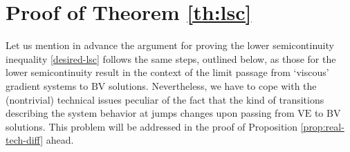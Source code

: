 \documentclass[a4paper,10pt,reqno]{amsart} %
\numberwithin{equation}{section}
\newcommand{\BV}{\mathrm{BV}}
\newcommand{\VE}{\mathrm{VE}}
\begin{document}
\section{Proof of Theorem \ref{th:lsc}}
\label{s:4}
Let us mention in advance the argument for proving the lower semicontinuity inequality \eqref{desired-lsc} follows the same steps, outlined below,  as those for the lower semicontinuity result \cite[Prop.\ 7.3]{MRS13}
in the context of the limit passage from `viscous' gradient systems to $\BV$ solutions. 
Nevertheless, we have to cope with  the (nontrivial)  technical issues peculiar of the fact that the kind of transitions describing the system behavior at jumps changes upon passing from $\VE$ to $\BV$ solutions. This problem will be addressed in the proof of Proposition  \ref{prop:real-tech-diff}  ahead. %
\end{document}
